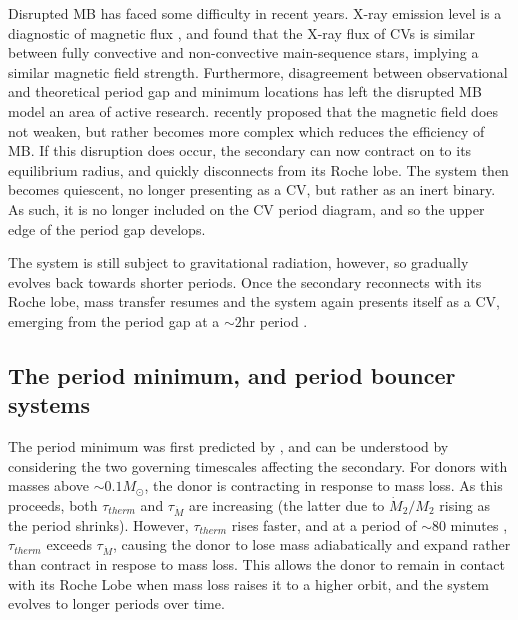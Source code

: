 Disrupted MB has faced some difficulty in recent years. X-ray emission level is a diagnostic of magnetic flux \citep{pevtsov2003}, and \citet{wright2016} found that the X-ray flux of CVs is similar between fully convective and non-convective main-sequence stars, implying a similar magnetic field strength. Furthermore, disagreement between observational and theoretical period gap and minimum locations \citep{knigge11} has left the disrupted MB model an area of active research. 
\citet{garraffo2018} recently proposed that the magnetic field does not weaken, but rather becomes more complex which reduces the efficiency of MB. If this disruption does occur, the secondary can now contract on to its equilibrium radius, and quickly disconnects from its Roche lobe. The system then becomes quiescent, no longer presenting as a CV, but rather as an inert binary. As such, it is no longer included on the CV period diagram, and so the upper edge of the period gap develops.

The system is still subject to gravitational radiation, however, so gradually evolves back towards shorter periods. Once the secondary reconnects with its Roche lobe, mass transfer resumes and the system again presents itself as a CV, emerging from the period gap at a $\sim2$hr period \citep{kolb2002}.

\subsection{The period minimum, and period bouncer systems}
\label{sect:introduction:period minimum and bouncers}

The period minimum was first predicted by \citet{rappaport1982}, and can be understood by considering the two governing timescales affecting the secondary. 
For donors with masses above $\sim0.1 M_{\odot}$, the donor is contracting in response to mass loss. 
As this proceeds, both $\tau_{therm}$ and $\tau_{\dot M}$ are increasing (the latter due to $\dot M_2 / M_2$ rising as the period shrinks). However, $\tau_{therm}$ rises faster, and at a period of $\sim80$ minutes \citep{ritter1998, McAllister2019}, $\tau_{therm}$ exceeds $\tau_{\dot M}$, causing the donor to lose mass adiabatically and expand rather than contract in respose to mass loss.
This allows the donor to remain in contact with its Roche Lobe when mass loss raises it to a higher orbit, and the system evolves to longer periods over time.

